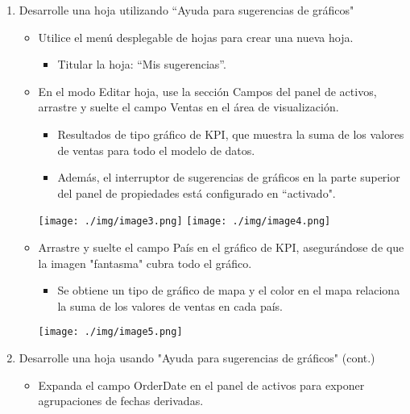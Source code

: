 \documentclass[12pt,letterpaper]{article}
\begin{document}
\begin{enumerate}
\begin{itemize}
    \end{itemize}
    \item Desarrolle una hoja utilizando ``Ayuda para sugerencias de gráficos"\\
    \begin{itemize}
        \item Utilice el menú desplegable de hojas para crear una nueva hoja.
        \begin{itemize}
            \item Titular la hoja: “Mis sugerencias”.
        \end{itemize}
        \item En el modo Editar hoja, use la sección Campos del panel de activos, arrastre y suelte el campo Ventas en el área de visualización.
        \begin{itemize}
            \item Resultados de tipo gráfico de KPI, que muestra la suma de los valores de ventas para todo el modelo de datos.
            \item Además, el interruptor de sugerencias de gráficos en la parte superior del panel de propiedades está configurado en ``activado".\\
        \end{itemize}
        \begin{center}
            \texttt{[image: ./img/image3.png]} 
            \texttt{[image: ./img/image4.png]}
        \end{center}
        \item Arrastre y suelte el campo País en el gráfico de KPI, asegurándose de que la imagen "fantasma" cubra todo el gráfico.
        \begin{itemize}
            \item Se obtiene un tipo de gráfico de mapa y el color en el mapa relaciona la suma de los valores de ventas en cada país.
        \end{itemize}
        \begin{center}
            \texttt{[image: ./img/image5.png]} 
        \end{center}
    \end{itemize}
    \item Desarrolle una hoja usando "Ayuda para sugerencias de gráficos" (cont.)\\
    \begin{itemize}
        \item Expanda el campo OrderDate en el panel de activos para exponer agrupaciones de fechas derivadas.

\end{itemize}
\end{enumerate}
\end{document}
